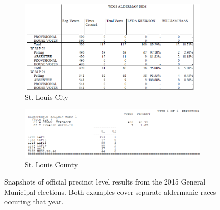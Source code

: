     \begin{figure}[H]
        \centering
        \begin{subfigure}{0.65\textwidth} %
            \includegraphics[width=\linewidth]{Figures/CityElection.png} %
            \caption{St. Louis City}
        \end{subfigure}
        
        \vspace{15pt} %
        
        \begin{subfigure}{0.99\textwidth} %
            \includegraphics[width=\linewidth]{Figures/CountyElection.png} %
            \caption{St. Louis County}
        \end{subfigure}
        
        \caption[Precinct Level Election Results Example]{Snapshots of official precinct level results from the 2015 General Municipal elections. Both examples cover separate aldermanic races occuring that year.}
        \label{fig:election}
    \end{figure}


